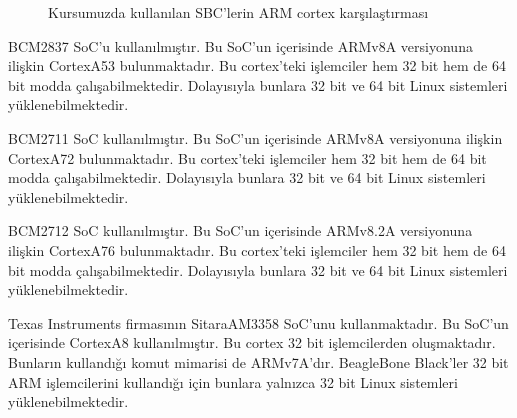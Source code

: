 \documentclass[letterpaper,10pt,turkish]{sphinxmanual}
\begin{document}
\begin{figure}[htbp]
\centering
\capstart

\noindent{}
\caption{Kursumuzda kullanılan SBC’lerin ARM cortex karşılaştırması}\label{\detokenize{introduction:id5}}\end{figure}
\begin{description}
\sphinxAtStartPar
BCM2837 SoC’u kullanılmıştır. Bu SoC’un içerisinde ARMv8\sphinxhyphen{}A versiyonuna ilişkin Cortex\sphinxhyphen{}A53
bulunmaktadır. Bu cortex’teki işlemciler hem 32 bit hem de 64 bit modda çalışabilmektedir.
Dolayısıyla bunlara 32 bit ve 64 bit Linux sistemleri yüklenebilmektedir.

\sphinxAtStartPar
BCM2711 SoC kullanılmıştır. Bu SoC’un içerisinde ARMv8\sphinxhyphen{}A versiyonuna ilişkin Cortex\sphinxhyphen{}A72
bulunmaktadır. Bu cortex’teki işlemciler hem 32 bit hem de 64 bit modda çalışabilmektedir.
Dolayısıyla bunlara 32 bit ve 64 bit Linux sistemleri yüklenebilmektedir.

\sphinxAtStartPar
BCM2712 SoC kullanılmıştır. Bu SoC’un içerisinde ARMv8.2\sphinxhyphen{}A versiyonuna ilişkin Cortex\sphinxhyphen{}A76
bulunmaktadır. Bu cortex’teki işlemciler hem 32 bit hem de 64 bit modda çalışabilmektedir.
Dolayısıyla bunlara 32 bit ve 64 bit Linux sistemleri yüklenebilmektedir.

\sphinxAtStartPar
Texas Instruments firmasının Sitara\sphinxhyphen{}AM3358 SoC’unu kullanmaktadır. Bu SoC’un içerisinde
Cortex\sphinxhyphen{}A8 kullanılmıştır. Bu cortex 32 bit işlemcilerden oluşmaktadır. Bunların kullandığı
komut mimarisi de ARMv7\sphinxhyphen{}A’dır. BeagleBone Black’ler 32 bit ARM işlemcilerini kullandığı için
bunlara yalnızca 32 bit Linux sistemleri yüklenebilmektedir.

\end{description}



\renewcommand{\indexname}{Dizin}
\printindex
\end{document}
